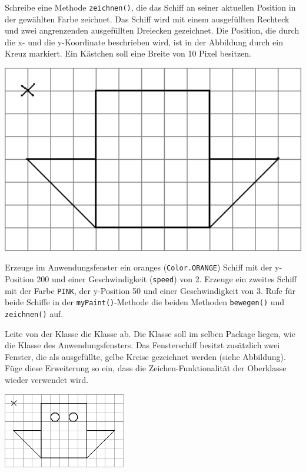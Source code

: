 \begin{compactenum}[a)]
\begin{minipage}{0.5\textwidth}
Schreibe eine Methode \verb|zeichnen()|, die das Schiff an
seiner aktuellen Position in der gewählten Farbe zeichnet.
Das Schiff wird mit einem ausgefüllten Rechteck und zwei
angrenzenden ausgefüllten Dreiecken gezeichnet. Die
Position, die durch die x- und die y-Koordinate beschrieben
wird, ist in der Abbildung durch ein Kreuz markiert. Ein
Kästchen soll eine Breite von 10 Pixel besitzen.
\end{minipage}
\hfill
\begin{minipage}{0.4\textwidth}
\includegraphics[width=1.0\textwidth]{./inf/SEKII/16_Java_Vererbung/Aufgabe5b2.png}
\end{minipage}

\item Erzeuge im Anwendungsfenster ein oranges (\verb|Color.ORANGE|) Schiff mit
der y-Position 200 und einer Geschwindigkeit (\verb|speed|) von 2. Erzeuge ein
zweites Schiff mit der Farbe \verb|PINK|, der y-Position 50 und einer
Geschwindigkeit von 3. Rufe für beide Schiffe in der \verb|myPaint()|-Methode
die beiden Methoden \verb|bewegen()| und \verb|zeichnen()| auf.

\item Leite von der Klasse  die Klasse 
ab. Die Klasse  soll im selben Package liegen, wie die
Klasse des Anwendungsfensters. Das Fensterschiff besitzt zusätzlich zwei
Fenster, die als ausgefüllte, gelbe Kreise gezeichnet werden (siehe Abbildung).
Füge diese Erweiterung so ein, dass die Zeichen-Funktionalität der Oberklasse
wieder verwendet wird.

\begin{center}
\includegraphics[width=0.4\textwidth]{./inf/SEKII/16_Java_Vererbung/Aufgabe5d.png}
\end{center}


\end{compactenum}
